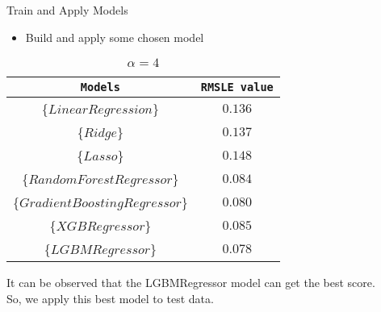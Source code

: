 \documentclass[
 size=14pt,
 paper=smartboard,  %
 mode=present, 		%
 display=slides, 	%
 style=tuliplab,  	%
 pauseslide,
 fleqn,leqno]{powerdot}
\begin{document}









\begin{slide}[toc=,bm=]{Train and Apply Models}
\begin{itemize}
\item
Build and apply some chosen model

\end{itemize}
\begin{table}
\setlength{\abovecaptionskip}{0pt}
\setlength{\belowcaptionskip}{10pt}
\centering
\caption{$\alpha = 4$}

\begin{tabular}{  c  |  c }
\toprule
\centering
\texttt{Models}  & \texttt{RMSLE value}  \\
\midrule
 {\{$LinearRegression$\}}       & $0.136$ \\
 {\{$Ridge$\}}                & $0.137$ \\
 {\{$Lasso$\} }                 & $0.148$ \\
 {\{$RandomForestRegressor$\}}       & $0.084$  \\
 	
 {\{$GradientBoostingRegressor$\}}      & $0.080$  \\
 	
 {\{$XGBRegressor$\} }            & $0.085$  \\
 	
 {\{$LGBMRegressor$\} }           & $0.078$  \\
\bottomrule
\end{tabular}
\end{table}
\begin{description}
	\item
	It can be observed that the LGBMRegressor model can get the best score. \\
	So, we apply this best model to test data.
	
\end{description}


\end{slide}
\end{document}
